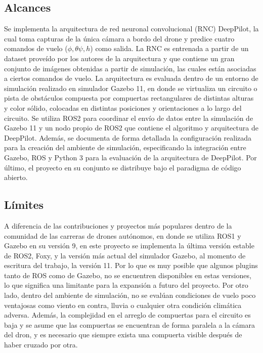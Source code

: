 \subsection{Alcances}
Se implementa la arquitectura de red neuronal convolucional (RNC) DeepPilot, la cual toma capturas de la única cámara a bordo del drone y predice cuatro comandos de vuelo ($\phi,\theta\psi,h$) como salida. La RNC es entrenada a partir de un dataset proveído por los autores de la arquitectura y que contiene un gran conjunto de imágenes obtenidas a partir de simulación, las cuales están asociadas a ciertos comandos de vuelo.    La arquitectura es evaluada dentro de un entorno de simulación realizado en simulador Gazebo 11, en donde se virtualiza un circuito o pista de obstáculos compuesta por compuertas rectangulares de distintas alturas y color sólido, colocadas en distintas posiciones y orientaciones a lo largo del circuito. Se utiliza ROS2 para coordinar el envío de datos entre la simulación de Gazebo 11 y un nodo propio de ROS2 que contiene el algoritmo y arquitectura de DeepPilot. Además, se documenta de forma detallada la configuración realizada para la creación del ambiente de simulación, especificando la integración entre Gazebo, ROS y Python 3 para la evaluación de la arquitectura de DeepPilot. Por último, el proyecto en su conjunto se distribuye bajo el paradigma de código abierto.

\subsection{Límites}
A diferencia de las contribuciones y proyectos más populares dentro de la comunidad de las carreras de drones autónomos, en donde se utiliza ROS1 y Gazebo en su versión 9, en este proyecto se implementa la última versión estable de ROS2, Foxy, y la versión más actual del simulador Gazebo, al momento de escritura del trabajo, la versión 11. Por lo que es muy posible que algunos plugins tanto de ROS como de Gazebo, no se encuentren disponibles en estas versiones, lo que significa una limitante para la expansión a futuro del proyecto. Por otro lado, dentro del ambiente de simulación, no se evalúan condiciones de vuelo poco ventajosas como viento en contra, lluvia o cualquier otra condición climática adversa. Además, la complejidad en el arreglo de compuertas para el circuito es baja y se asume que las compuertas se encuentran de forma paralela a la cámara del dron, y  es necesario que siempre exista una compuerta visible después de haber cruzado por otra.


